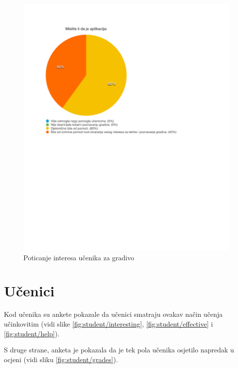 \documentclass[11pt]{scrreprt}
\begin{document}
\begin{figure}[H]
  \includegraphics[width=\textwidth, clip=true, trim=0 2.5cm 0 0]{school/help}
  \caption{Poticanje interesa učenika za gradivo}
  \label{fig:school/help}
\end{figure}

\section{Učenici}

Kod učenika su ankete pokazale da učenici smatraju ovakav način učenja
učinkovitim (vidi slike \ref{fig:student/interesting},
\ref{fig:student/effective} i \ref{fig:student/help}).

S druge strane, anketa je pokazala da je tek pola učenika osjetilo napredak u
ocjeni (vidi sliku \ref{fig:student/grades}).
\end{document}

